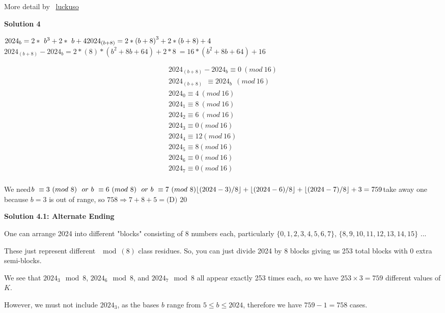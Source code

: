 \begin{enumerate}
 More detail by ~\href{https://artofproblemsolving.com/wiki/index.php/User:Cyantist}{luckuso}

 



\textbf{Solution 4}

$2024_b=2\ast\ b^3+2\ast\ b+4\ \\ {2024}_{\left(b+8\right)}=2\ast\left(b+8\right)^3+2\ast\left(b+8\right)+4$${2024}_{\left(b+8\right)}-{2024}_b=2*\left(8\right)*\left(b^2+8b+64\right)+2*8\ =16*\left(b^2+8b+64\right)+16$

 \begin{align*}2024_{(b+8)}-2024_b\equiv0\ (mod\ 16)\\2024_{(b+8)}\ \ \equiv2024_b\ \ (mod\ 16)\\2024_0\equiv4\ (mod\ 16)\\2024_1\equiv8\ (mod\ 16)\\2024_2\equiv6\ (mod\ 16)\\2024_3\equiv0(mod\ 16)\\2024_4\equiv12(mod\ 16)\\2024_5\equiv8(mod\ 16)\\2024_6\equiv0(mod\ 16)\\2024_7\equiv0(mod\ 16)\\\end{align*}


 We need$b\ \equiv3\ (mod\ 8)\ \ or\ b\ \equiv6\ (mod\ 8)\ \ or\ b\ \equiv7\ (mod\ 8) \\ \lfloor(2024-3)/8\rfloor+\lfloor(2024-6)/8\rfloor+\lfloor(2024-7)/8\rfloor+3=759$take away one because $b=3$ is out of range, so $758\Rightarrow7+8+5=\boxed{\text{(D) }20}$




\textbf{Solution 4.1: Alternate Ending}

One can arrange 2024 into different "blocks" consisting of 8 numbers each, particularly \( \{0,1,2,3,4,5,6,7\} \), \( \{8,9,10,11,12,13,14,15\} \) ...

 These just represent different \( \mod(8) \) class residues. So, you can just divide 2024 by 8 blocks giving us 253 total blocks with 0 extra semi-blocks.

 We see that \( 2024_3 \mod 8 \), \( 2024_6 \mod 8 \), and \( 2024_7 \mod 8 \) all appear exactly 253 times each, so we have \( 253 \times 3 = 759 \) different values of \( K \).

 However, we must not include \( 2024_3 \), as the bases \( b \) range from \( 5 \le b \le 2024 \), therefore we have \( 759-1=758 \) cases.


\end{enumerate}
